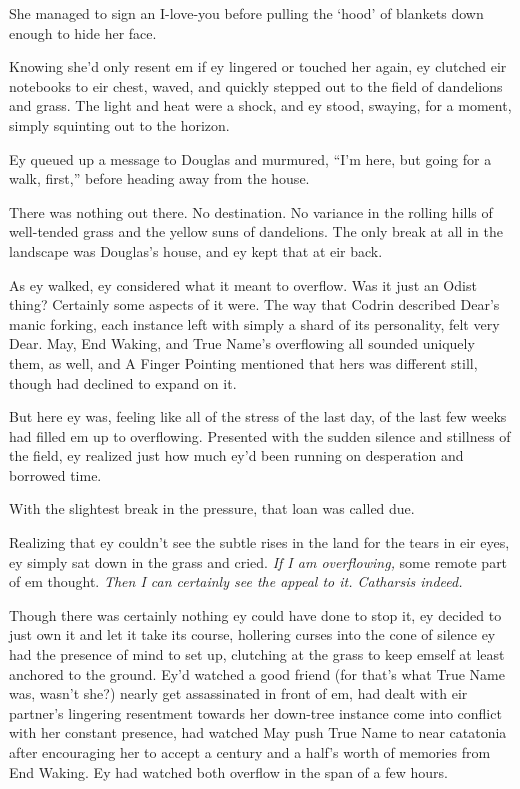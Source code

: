 She managed to sign an I-love-you before pulling the `hood' of blankets down enough to hide her face.

Knowing she'd only resent em if ey lingered or touched her again, ey clutched eir notebooks to eir chest, waved, and quickly stepped out to the field of dandelions and grass. The light and heat were a shock, and ey stood, swaying, for a moment, simply squinting out to the horizon.

Ey queued up a message to Douglas and murmured, ``I'm here, but going for a walk, first,'' before heading away from the house.

There was nothing out there. No destination. No variance in the rolling hills of well-tended grass and the yellow suns of dandelions. The only break at all in the landscape was Douglas's house, and ey kept that at eir back.

As ey walked, ey considered what it meant to overflow. Was it just an Odist thing? Certainly some aspects of it were. The way that Codrin described Dear's manic forking, each instance left with simply a shard of its personality, felt very Dear. May, End Waking, and True Name's overflowing all sounded uniquely them, as well, and A Finger Pointing mentioned that hers was different still, though had declined to expand on it.

But here ey was, feeling like all of the stress of the last day, of the last few weeks had filled em up to overflowing. Presented with the sudden silence and stillness of the field, ey realized just how much ey'd been running on desperation and borrowed time.

With the slightest break in the pressure, that loan was called due.

Realizing that ey couldn't see the subtle rises in the land for the tears in eir eyes, ey simply sat down in the grass and cried. \emph{If I am overflowing,} some remote part of em thought. \emph{Then I can certainly see the appeal to it. Catharsis indeed.}

Though there was certainly nothing ey could have done to stop it, ey decided to just own it and let it take its course, hollering curses into the cone of silence ey had the presence of mind to set up, clutching at the grass to keep emself at least anchored to the ground. Ey'd watched a good friend (for that's what True Name was, wasn't she?) nearly get assassinated in front of em, had dealt with eir partner's lingering resentment towards her down-tree instance come into conflict with her constant presence, had watched May push True Name to near catatonia after encouraging her to accept a century and a half's worth of memories from End Waking. Ey had watched both overflow in the span of a few hours.

